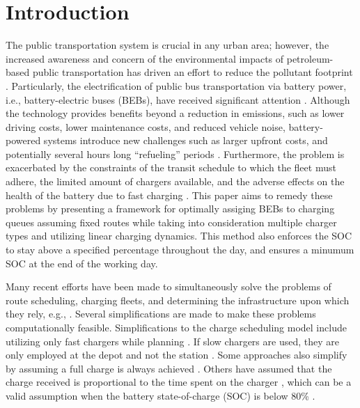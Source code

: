 \documentclass[utf8]{FrontiersinHarvard}
\let\cite\citep                                       %
\newcommand{\EDIT}[1]{{\color{blue}#1}}                                         %
\begin{document}
\section{Introduction}
\label{sec:introduction}
The public transportation system is crucial in any urban area; however, the increased awareness and concern of the
environmental impacts of petroleum-based public transportation has driven an effort to reduce the pollutant footprint
\cite{de-2014-simul-elect,xylia-2018-role-charg,guida-2017-zeeus-repor-europ,li-2016-batter-elect}. Particularly,
the electrification of public bus transportation via battery power, i.e., battery-electric buses (BEBs), have received
significant attention \cite{li-2016-batter-elect}. Although the technology provides benefits beyond a reduction in
emissions, such as lower driving costs, lower maintenance costs, and reduced vehicle noise, battery-powered systems
introduce new challenges such as larger upfront costs, and potentially several hours long ``refueling'' periods
\cite{xylia-2018-role-charg,li-2016-batter-elect}. Furthermore, the problem is exacerbated by the constraints of the
transit schedule to which the fleet must adhere, the limited amount of chargers available, and the adverse effects on
the health of the battery due to fast charging \cite{lutsey-2019-updat-elect}. This paper \EDIT{aims to remedy these problems by presenting} a framework for optimally assiging BEBs to charging queues assuming fixed routes
while taking into consideration multiple charger types and utilizing linear charging dynamics. This method also enforces
the SOC to stay above a specified percentage throughout the day, and ensures a minumum SOC at the end of the working
day.

Many recent efforts have been made to simultaneously solve the problems of route scheduling, charging fleets, and
determining the infrastructure upon which they rely, e.g., \cite{wei-2018-optim-spatio,sebastiani-2016-evaluat-elect,hoke-2014-accoun-lithium,wang-2017-elect-vehic}. Several simplifications are made to make these problems
computationally feasible. Simplifications to the charge scheduling model include utilizing only fast chargers while
planning \cite{wei-2018-optim-spatio,sebastiani-2016-evaluat-elect,wang-2017-optim-rechar,zhou-2020-bi-objec,yang-2018-charg-sched,wang-2017-elect-vehic,qin-2016-numer-analy,liu-2020-batter-elect}. If slow chargers are used,
they are only employed at the depot and not the station \cite{he-2020-optim-charg,tang-2019-robus-sched}. Some
approaches also simplify by assuming a full charge is always achieved
\cite{wei-2018-optim-spatio,wang-2017-elect-vehic,zhou-2020-bi-objec,wang-2017-optim-rechar}. Others have assumed
that the charge received is proportional to the time spent on the charger
\cite{liu-2020-batter-elect,yang-2018-charg-sched}, which can be a valid assumption when the battery state-of-charge
(SOC) is below 80\% \cite{liu-2020-batter-elect}.
\end{document}
